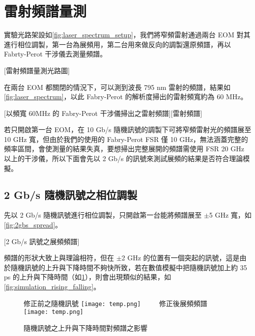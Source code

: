 \documentclass[class=NCU_thesis, crop=false]{standalone}
\begin{document}
\section{雷射頻譜量測}

實驗光路架設如\cref{fig:laser_spectrum_setup}，我們將窄頻雷射通過兩台 EOM 對其進行相位調製，第一台為展頻用，第二台用來做反向的調製還原頻譜，再以 Fabrty-Perot 干涉儀去測量頻譜。

[雷射頻譜量測光路圖]

在兩台 EOM 都關閉的情況下，可以測到波長 795 nm 雷射的頻譜，結果如\cref{fig:laser_spectrum}，以此 Fabry-Perot 的解析度掃出的雷射頻寬約為 60 MHz。

[以頻寬 60MHz 的 Fabry-Perot 干涉儀掃出之雷射頻譜][雷射頻譜]


若只開啟第一台 EOM，在 10 Gb/s 隨機訊號的調製下可將窄頻雷射光的頻譜展至 10 GHz 寬，但由於我們的使用的 Fabry-Perot FSR 僅 10 GHz，無法涵蓋完整的頻率區間，會使測量的結果失真，要想掃出完整展開的頻譜需使用 FSR 20 GHz 以上的干涉儀，所以下面會先以 2 Gb/s 的訊號來測試展頻的結果是否符合理論模擬。

\subsection{2 Gb/s 隨機訊號之相位調製}
先以 2 Gb/s 隨機訊號進行相位調製，只開啟第一台能將頻譜展至 $\pm$5 GHz 寬，如\cref{fig:2gbs_spread}。

[2 Gb/s 訊號之展頻頻譜]

頻譜的形狀大致上與理論相符，但在 $\pm$2 GHz 的位置有一個突起的訊號，這是由於隨機訊號的上升與下降時間不夠快所致，若在數值模擬中把隨機訊號加上約 35 ps 的上升與下降時間（如\cref{fig:simulation_rising_falling_prbs}），則會出現類似的結果，如\cref{fig:simulation_rising_falling}。

\begin{figure}[!hbt]
    \centering
    \subcaptionbox
        {修正前之隨機訊號
        \label{fig:subfig_fig1}}
        {\texttt{[image: temp.png]}}
    ~~~~
    \subcaptionbox
        {修正後展頻頻譜
        \label{fig:subfig_fig2}}
        {\texttt{[image: temp.png]}}
    \caption{隨機訊號之上升與下降時間對頻譜之影響}
    \label{fig:simulation_rising_falling_prbs}
\end{figure}
\end{document}
